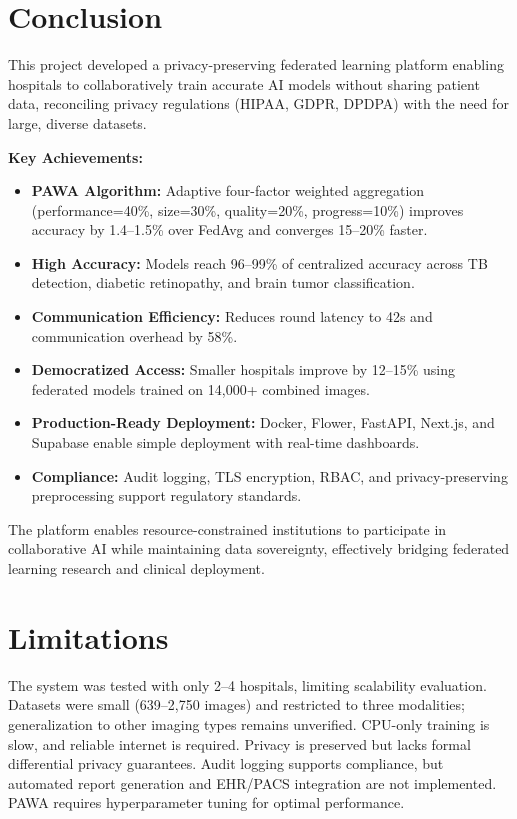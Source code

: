 \section{Conclusion}

This project developed a privacy-preserving federated learning platform enabling hospitals to collaboratively train accurate AI models without sharing patient data, reconciling privacy regulations (HIPAA, GDPR, DPDPA) with the need for large, diverse datasets.

\textbf{Key Achievements:}
\begin{itemize}
    \item \textbf{PAWA Algorithm:} Adaptive four-factor weighted aggregation (performance=40\%, size=30\%, quality=20\%, progress=10\%) improves accuracy by 1.4--1.5\% over FedAvg and converges 15--20\% faster.
    \item \textbf{High Accuracy:} Models reach 96--99\% of centralized accuracy across TB detection, diabetic retinopathy, and brain tumor classification.
    \item \textbf{Communication Efficiency:} Reduces round latency to 42s and communication overhead by 58\%.
    \item \textbf{Democratized Access:} Smaller hospitals improve by 12--15\% using federated models trained on 14,000+ combined images.
    \item \textbf{Production-Ready Deployment:} Docker, Flower, FastAPI, Next.js, and Supabase enable simple deployment with real-time dashboards.
    \item \textbf{Compliance:} Audit logging, TLS encryption, RBAC, and privacy-preserving preprocessing support regulatory standards.
\end{itemize}

The platform enables resource-constrained institutions to participate in collaborative AI while maintaining data sovereignty, effectively bridging federated learning research and clinical deployment.

\section{Limitations}

The system was tested with only 2--4 hospitals, limiting scalability evaluation. Datasets were small (639--2,750 images) and restricted to three modalities; generalization to other imaging types remains unverified. CPU-only training is slow, and reliable internet is required. Privacy is preserved but lacks formal differential privacy guarantees. Audit logging supports compliance, but automated report generation and EHR/PACS integration are not implemented. PAWA requires hyperparameter tuning for optimal performance.

